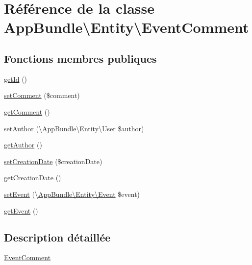 \hypertarget{classAppBundle_1_1Entity_1_1EventComment}{}\section{Référence de la classe App\+Bundle\textbackslash{}Entity\textbackslash{}Event\+Comment}
\label{classAppBundle_1_1Entity_1_1EventComment}
\subsection*{Fonctions membres publiques}
\begin{DoxyCompactItemize}
\item 
\hyperlink{classAppBundle_1_1Entity_1_1EventComment_aa6782b6b3e4d8d79a0078f081dce8f77}{get\+Id} ()
\item 
\hyperlink{classAppBundle_1_1Entity_1_1EventComment_a6e64399a96d509fd4db92483983b8212}{set\+Comment} (\$comment)
\item 
\hyperlink{classAppBundle_1_1Entity_1_1EventComment_aee93b38240e569eb65ee2881a8915c11}{get\+Comment} ()
\item 
\hyperlink{classAppBundle_1_1Entity_1_1EventComment_a99fe91a4d8b27dbf20237cfe72ffdbae}{set\+Author} (\textbackslash{}\hyperlink{classAppBundle_1_1Entity_1_1User}{App\+Bundle\textbackslash{}\+Entity\textbackslash{}\+User} \$author)
\item 
\hyperlink{classAppBundle_1_1Entity_1_1EventComment_a4baec2dc81f313183685a183bab702b3}{get\+Author} ()
\item 
\hyperlink{classAppBundle_1_1Entity_1_1EventComment_a620976f19d00e547d52009a2888e33dc}{set\+Creation\+Date} (\$creation\+Date)
\item 
\hyperlink{classAppBundle_1_1Entity_1_1EventComment_ad33f5e70a7830c73d36b5d4a7b5d807c}{get\+Creation\+Date} ()
\item 
\hyperlink{classAppBundle_1_1Entity_1_1EventComment_ab2ea9eb99d49939f4ff925f127a14c14}{set\+Event} (\textbackslash{}\hyperlink{classAppBundle_1_1Entity_1_1Event}{App\+Bundle\textbackslash{}\+Entity\textbackslash{}\+Event} \$event)
\item 
\hyperlink{classAppBundle_1_1Entity_1_1EventComment_a669d14ee74682b5fbb3aa9df1ec492a2}{get\+Event} ()
\end{DoxyCompactItemize}


\subsection{Description détaillée}
\hyperlink{classAppBundle_1_1Entity_1_1EventComment}{Event\+Comment}

